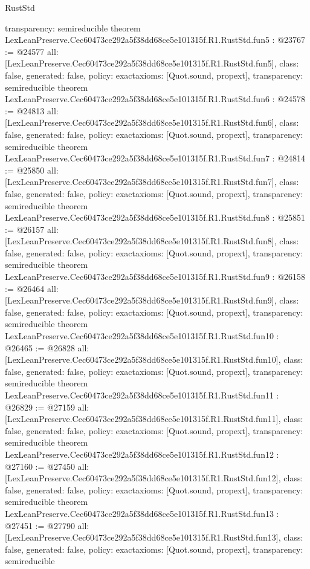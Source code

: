 \begin{lexlean}{RustStd}
\begin{coremodule}
{  transparency: semireducible
}
theorem LexLeanPreserve.Cec60473ce292a5f38dd68ce5e101315f.R1.RustStd.fun5 : @23767 := @24577 {
  all: [LexLeanPreserve.Cec60473ce292a5f38dd68ce5e101315f.R1.RustStd.fun5],
  class: false,
  generated: false,
  policy: exact{axioms: [Quot.sound, propext]},
  transparency: semireducible
}
theorem LexLeanPreserve.Cec60473ce292a5f38dd68ce5e101315f.R1.RustStd.fun6 : @24578 := @24813 {
  all: [LexLeanPreserve.Cec60473ce292a5f38dd68ce5e101315f.R1.RustStd.fun6],
  class: false,
  generated: false,
  policy: exact{axioms: [Quot.sound, propext]},
  transparency: semireducible
}
theorem LexLeanPreserve.Cec60473ce292a5f38dd68ce5e101315f.R1.RustStd.fun7 : @24814 := @25850 {
  all: [LexLeanPreserve.Cec60473ce292a5f38dd68ce5e101315f.R1.RustStd.fun7],
  class: false,
  generated: false,
  policy: exact{axioms: [Quot.sound, propext]},
  transparency: semireducible
}
theorem LexLeanPreserve.Cec60473ce292a5f38dd68ce5e101315f.R1.RustStd.fun8 : @25851 := @26157 {
  all: [LexLeanPreserve.Cec60473ce292a5f38dd68ce5e101315f.R1.RustStd.fun8],
  class: false,
  generated: false,
  policy: exact{axioms: [Quot.sound, propext]},
  transparency: semireducible
}
theorem LexLeanPreserve.Cec60473ce292a5f38dd68ce5e101315f.R1.RustStd.fun9 : @26158 := @26464 {
  all: [LexLeanPreserve.Cec60473ce292a5f38dd68ce5e101315f.R1.RustStd.fun9],
  class: false,
  generated: false,
  policy: exact{axioms: [Quot.sound, propext]},
  transparency: semireducible
}
theorem LexLeanPreserve.Cec60473ce292a5f38dd68ce5e101315f.R1.RustStd.fun10 : @26465 := @26828 {
  all: [LexLeanPreserve.Cec60473ce292a5f38dd68ce5e101315f.R1.RustStd.fun10],
  class: false,
  generated: false,
  policy: exact{axioms: [Quot.sound, propext]},
  transparency: semireducible
}
theorem LexLeanPreserve.Cec60473ce292a5f38dd68ce5e101315f.R1.RustStd.fun11 : @26829 := @27159 {
  all: [LexLeanPreserve.Cec60473ce292a5f38dd68ce5e101315f.R1.RustStd.fun11],
  class: false,
  generated: false,
  policy: exact{axioms: [Quot.sound, propext]},
  transparency: semireducible
}
theorem LexLeanPreserve.Cec60473ce292a5f38dd68ce5e101315f.R1.RustStd.fun12 : @27160 := @27450 {
  all: [LexLeanPreserve.Cec60473ce292a5f38dd68ce5e101315f.R1.RustStd.fun12],
  class: false,
  generated: false,
  policy: exact{axioms: [Quot.sound, propext]},
  transparency: semireducible
}
theorem LexLeanPreserve.Cec60473ce292a5f38dd68ce5e101315f.R1.RustStd.fun13 : @27451 := @27790 {
  all: [LexLeanPreserve.Cec60473ce292a5f38dd68ce5e101315f.R1.RustStd.fun13],
  class: false,
  generated: false,
  policy: exact{axioms: [Quot.sound, propext]},
  transparency: semireducible
}
\end{coremodule}
\end{lexlean}
